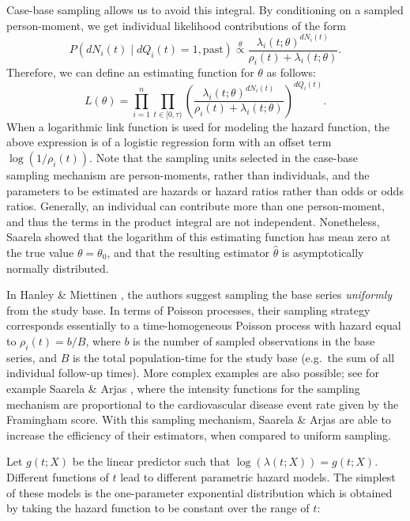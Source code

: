 \documentclass[
]{jss}
\begin{document}
Case-base sampling allows us to avoid this integral. By conditioning on
a sampled person-moment, we get individual likelihood contributions of
the form
\[P(dN_{i}(t) \mid dQ_{i}(t) = 1,\mathrm{past}) \stackrel{\theta}{\propto} \frac{\lambda_{i}(t; \theta)^{dN_{i}(t)}}{\rho_i(t) + \lambda_{i}(t;\theta)}.\]
Therefore, we can define an estimating function for \(\theta\) as
follows:
\[L(\theta) = \prod_{i=1}^{n} \prod_{t\in[0,\tau)} \left(\frac{\lambda_{i}(t; \theta)^{dN_{i}(t)}}{\rho_i(t) + \lambda_{i}(t;\theta)}\right)^{dQ_i(t)}.\]
When a logarithmic link function is used for modeling the hazard
function, the above expression is of a logistic regression form with an
offset term \(\log(1/\rho_i(t))\). Note that the sampling units selected
in the case-base sampling mechanism are person-moments, rather than
individuals, and the parameters to be estimated are hazards or hazard
ratios rather than odds or odds ratios. Generally, an individual can
contribute more than one person-moment, and thus the terms in the
product integral are not independent. Nonetheless, Saarela
\citeyearpar{saarela2016case} showed that the logarithm of this
estimating function has mean zero at the true value \(\theta=\theta_0\),
and that the resulting estimator \(\hat{\theta}\) is asymptotically
normally distributed.

In Hanley \& Miettinen \citeyearpar{hanley2009fitting}, the authors
suggest sampling the base series \emph{uniformly} from the study base.
In terms of Poisson processes, their sampling strategy corresponds
essentially to a time-homogeneous Poisson process with hazard equal to
\(\rho_i(t) = b/B\), where \(b\) is the number of sampled observations
in the base series, and \(B\) is the total population-time for the study
base (e.g.~the sum of all individual follow-up times). More complex
examples are also possible; see for example Saarela \& Arjas
\citeyearpar{saarela2015non}, where the intensity functions for the
sampling mechanism are proportional to the cardiovascular disease event
rate given by the Framingham score. With this sampling mechanism,
Saarela \& Arjas are able to increase the efficiency of their
estimators, when compared to uniform sampling.

Let \(g(t; X)\) be the linear predictor such that
\(\log(\lambda(t;X)) = g(t; X)\). Different functions of \(t\) lead to
different parametric hazard models. The simplest of these models is the
one-parameter exponential distribution which is obtained by taking the
hazard function to be constant over the range of \(t\):
\end{document}
